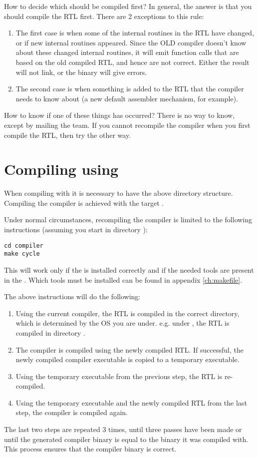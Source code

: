 How to decide which should be compiled first? In general, the answer is that
you should compile the RTL first. There are 2 exceptions to this rule:
\begin{enumerate}
\item The first case is when some of the internal routines in the RTL
have changed, or if new internal routines appeared. Since the OLD compiler
doesn't know about these changed internal routines, it will emit function
calls that are based on the old compiled RTL, and hence are not correct.
Either the result will not link, or the binary will give errors.
\item The second case is when something is added to the RTL that the
compiler needs to know about (a new default assembler mechanism, for
example).
\end{enumerate}
How to know if one of these things has occurred? There is no way to know,
except by mailing the \fpc team. If you cannot recompile the compiler
when you first compile the RTL, then try the other way.

\section{Compiling using }

When compiling with  it is necessary to have the above directory
structure. Compiling the compiler is achieved with the target .

Under normal circumstances, recompiling the compiler is limited to the
following instructions (assuming you start in directory ):
\begin{verbatim}
cd compiler
make cycle
\end{verbatim}
This will work only if the  is installed correctly and
if the needed tools are present in the . Which tools must be
installed can be found in appendix \ref{ch:makefile}.

The above instructions will do the following:
\begin{enumerate}
\item Using the current compiler, the RTL is compiled in the correct
directory, which is determined by the OS you are under. e.g. under \linux,
the RTL is compiled in directory .
\item The compiler is compiled using the newly compiled RTL. If successful,
the newly compiled compiler executable is copied to a temporary executable.
\item Using the temporary executable from the previous step, the RTL is
re-compiled.
\item Using the temporary executable and the newly compiled RTL from the
last step, the compiler is compiled again.
\end{enumerate}
The last two steps are repeated 3 times, until three passes have been made or
until the generated compiler binary is equal to the binary it was compiled
with. This process ensures that the compiler binary is correct.

